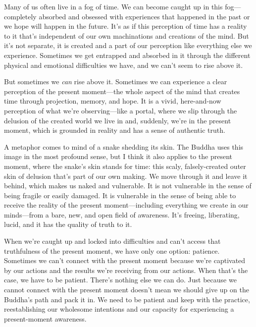 
Many of us often live in a fog of time. We can become caught up in this 
fog---completely absorbed and obsessed with experiences that happened 
in the past or we hope will happen in the future. It's as if this 
perception of time has a reality to it that's independent of our own 
machinations and creations of the mind. But it's not separate, it is 
created and a part of our perception like everything else we 
experience. Sometimes we get entrapped and absorbed in it through the 
different physical and emotional difficulties we have, and we can't 
seem to rise above it.

But sometimes we \emph{can} rise above it. Sometimes we can experience 
a clear perception of the present moment---the whole aspect of the mind 
that creates time through projection, memory, and hope. It is a vivid, 
here-and-now perception of what we're observing---like a portal, where 
we slip through the delusion of the created world we live in and, 
suddenly, we're in the present moment, which is grounded in reality and 
has a sense of authentic truth.

A metaphor comes to mind of a snake shedding its skin. The Buddha uses 
this image in the most profound sense, but I think it also applies to 
the present moment, where the snake's skin stands for time: this scaly, 
falsely-created outer skin of delusion that's part of our own making. 
We move through it and leave it behind, which makes us naked and 
vulnerable. It is not vulnerable in the sense of being fragile or 
easily damaged. It is vulnerable in the sense of being able to receive 
the reality of the present moment---including everything we create in 
our minds---from a bare, new, and open field of awareness. It's 
freeing, liberating, lucid, and it has the quality of truth to it.

When we're caught up and locked into difficulties and can't access that 
truthfulness of the present moment, we have only one option: patience. 
Sometimes we can't connect with the present moment because we're 
captivated by our actions and the results we're receiving from our 
actions. When that's the case, we have to be patient. There's nothing 
else we can do. Just because we cannot connect with the present moment 
doesn't mean we should give up on the Buddha's path and pack it in. We 
need to be patient and keep with the practice, reestablishing our 
wholesome intentions and our capacity for experiencing a present-moment 
awareness.


